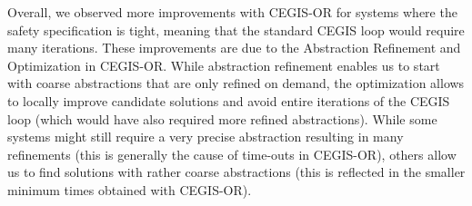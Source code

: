 \documentclass[a4paper,UKenglish]{lipics-v2018}
\newcommand{\note}[1]{\textcolor{red}{[#1]}}
\begin{document}
Overall, we observed more improvements with CEGIS-OR for
systems where the safety specification is tight, 
meaning that the standard CEGIS loop would require many iterations.
These improvements are due to the Abstraction Refinement and Optimization in CEGIS-OR.
While abstraction refinement enables us to start with coarse abstractions
that are only refined on demand, 
the optimization
allows to locally improve candidate solutions and avoid entire iterations of the CEGIS loop
(which would have also required more refined abstractions).
While some systems might still require a very precise
abstraction resulting in many refinements
(this is generally the cause of time-outs in CEGIS-OR),
others allow us to find solutions with rather coarse
abstractions (this is reflected in the smaller minimum
times obtained with CEGIS-OR). 


\end{document}
